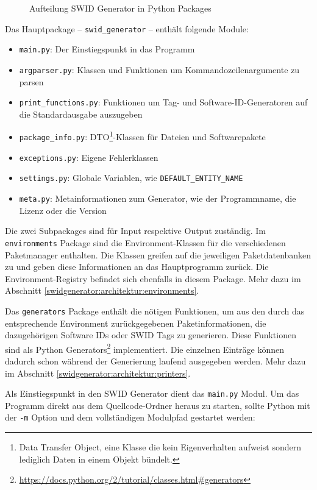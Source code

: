 \begin{figure}[H]
	\centering
	
	\caption{Aufteilung SWID Generator in Python Packages}
\end{figure}

Das Hauptpackage -- \texttt{swid\_generator} -- enthält folgende Module:

\begin{itemize}
	\item \texttt{main.py}: Der Einstiegspunkt in das Programm
	\item \texttt{argparser.py}: Klassen und Funktionen um
		Kommandozeilenargumente zu parsen
	\item \texttt{print\_functions.py}: Funktionen um Tag- und
		Software-ID-Generatoren auf die Standardausgabe auszugeben
	\item \texttt{package\_info.py}: DTO\footnote{Data Transfer Object, eine
		Klasse die kein Eigenverhalten aufweist sondern lediglich Daten in
		einem Objekt bündelt.}-Klassen für Dateien und Softwarepakete
	\item \texttt{exceptions.py}: Eigene Fehlerklassen
	\item \texttt{settings.py}: Globale Variablen, wie \zb
		\texttt{DEFAULT\_ENTITY\_NAME}
	\item \texttt{meta.py}: Metainformationen zum Generator, wie \zb der
		Programmname, die Lizenz oder die Version
\end{itemize}

Die zwei Subpackages sind für Input respektive Output zuständig. Im
\texttt{environments} Package sind die Environment-Klassen für die verschiedenen
Paketmanager enthalten. Die Klassen greifen auf die jeweiligen Paketdatenbanken
zu und geben diese Informationen an das Hauptprogramm zurück. Die
Environment-Registry befindet sich ebenfalls in diesem Package. Mehr dazu im
Abschnitt \ref{swidgenerator:architektur:environments}.

Das \texttt{generators} Package enthält die nötigen Funktionen, um aus den durch
das entsprechende Environment zurückgegebenen Paketinformationen, die
dazugehörigen Software IDs oder SWID Tags zu generieren. Diese Funktionen sind
als Python Generators\footnote{\url{https://docs.python.org/2/tutorial/classes.html\#generators}}
implementiert. Die einzelnen Einträge können dadurch schon während der Generierung 
laufend ausgegeben werden. Mehr dazu im Abschnitt \ref{swidgenerator:architektur:printers}.

Als Einstiegspunkt in den SWID Generator dient das \texttt{main.py} Modul. Um
das Programm direkt aus dem Quellcode-Ordner heraus zu starten, sollte Python
mit der \texttt{-m} Option und dem vollständigen Modulpfad gestartet werden:

